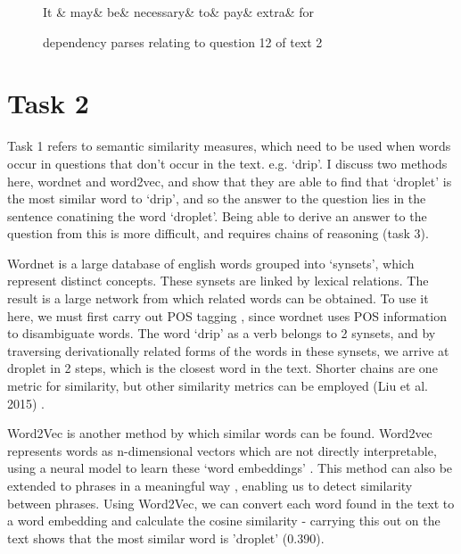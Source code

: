 \documentclass[12pt,a4paper]{article}
\begin{document}
\begin{figure}
\centering
\begin{dependency}
    \begin{deptext}[column sep=1em]
        It \& may\& be\& necessary\& to\& pay\& extra\& for \\
    \end{deptext}
\end{dependency}
\caption{dependency parses relating to question 12 of text 2}
\label{fig:deps-q2_2}

\end{figure}


\section*{Task 2}

Task 1 refers to semantic similarity measures, which need to be used when words occur in questions that don't occur in the text. e.g. `drip'. I discuss two methods here, wordnet and word2vec, and show that they are able to find that `droplet' is the most similar word to `drip', and so the answer to the question lies in the sentence conatining the word `droplet'. Being able to derive an answer to the question from this is more difficult, and requires chains of reasoning (task 3).

Wordnet is a large database of english words grouped into `synsets', which represent distinct concepts. These synsets are linked by lexical relations. The result is a large network from which related words can be obtained. To use it here, we must first carry out POS tagging \cite{NLP_lec2}, since wordnet uses POS information to disambiguate words. The word `drip' as a verb belongs to 2 synsets, and by traversing derivationally related forms of the words in these synsets, we arrive at droplet in 2 steps, which is the closest word in the text. Shorter chains  are one metric for similarity, but other similarity metrics can be employed (Liu et al. 2015) \cite{wn_sim}.

Word2Vec is another method by which similar words can be found. Word2vec represents words as n-dimensional vectors which are not directly interpretable, using a neural model to learn these `word embeddings' \cite{nlp_lec??}. This method can also be extended to phrases in a meaningful way \cite{mikolov2013distributed}, enabling us to detect similarity between phrases. Using Word2Vec, we can convert each word found in the text to a word embedding and calculate the cosine similarity - carrying this out on the text shows that the most similar word is 'droplet' (0.390).
\end{document}
